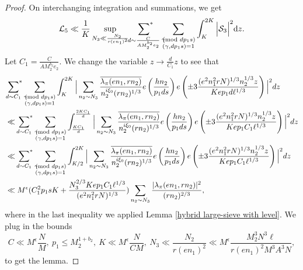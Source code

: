 \documentclass[12pt,a4paper,twoside, reqno]{amsart}
\newcommand{\shortmod}{\ensuremath{\negthickspace \negthickspace \negthickspace \pmod}}
\newcommand{\sumstar}{\sideset{}{^*}\sum}
\begin{document}
\begin{proof}
On interchanging integration and summations, we get 
\begin{align*}
     \mathcal{L}_5 \ll \frac{1}{K} \sup_{N_3 \ll \frac{N_2}{r (en_1)^2}} \mathop{\sumstar_{ \substack{d \sim \frac{C}{A M_2^{b_2} e_2}
       } } }\sum_{\substack{ \gamma \shortmod{dp_1s} \\ (\gamma, dp_1s)=1 }   }  \int_K^{2K}  \Big| \mathcal{S}_3  \Big|^2 \mathrm{d}z.
\end{align*}
Let $C_1=\frac{C}{AM_2^{b_2}e_2} $. We change the variable $z \rightarrow  \frac{d}{C_1}z$ to see that 
\begin{align*}
     &\mathop{\sumstar_{ \substack{d \sim {C_1}{ }
       } } }\sum_{\substack{ \gamma \shortmod{dp_1s} \\ (\gamma, dp_1s)=1 }   }  \int_K^{2K}  \Big|  \sum_{n_2 \sim N_3} \frac{\overline{\lambda_\pi(en_1,rn_2)}}{n_2^{i \xi_0}  {(rn_2)^{1/3}}  }  e\left( \frac{hn_2}{p_1ds}\right) e\left(\pm 3 \frac{(e^2n_1^2r N)^{1/3}n_2^{1/3}z^{} }{ K ep_1d \ell^{{1/3}}}\right)  \Big|^2 dz \\
       & \ll   \mathop{\sumstar_{ \substack{d \sim  {C_1}{ }
       } } }\sum_{\substack{ \gamma \shortmod{dp_1s} \\ (\gamma, dp_1s)=1 }   }  \int_{\frac{KC_1}{d} }^{ \frac{2KC_1}{d}}  \Big|  \sum_{n_2 \sim N_3} \frac{\overline{\lambda_\pi(en_1,rn_2)}}{n_2^{i \xi_0}  {(rn_2)^{1/3}}  }  e\left( \frac{hn_2}{p_1ds}\right) e\left(\pm 3 \frac{(e^2n_1^2r N)^{1/3}n_2^{1/3}z^{} }{ K ep_1C_1 \ell^{{1/3}}}\right)  \Big|^2 dz  \\
        & \ll   \mathop{\sumstar_{ \substack{d \sim  {C_1}{ }
       } } }\sum_{\substack{ \gamma \shortmod{dp_1s} \\ (\gamma, dp_1s)=1 }   }  \int_{{K/2}{} }^{ {2K}{}}  \Big|  \sum_{n_2 \sim N_3} \frac{\overline{\lambda_\pi(en_1,rn_2)}}{n_2^{i \xi_0}  {(rn_2)^{1/3}}  }  e\left( \frac{hn_2}{p_1ds}\right) e\left(\pm 3 \frac{(e^2n_1^2r N)^{1/3}n_2^{1/3}z^{} }{ K ep_1C_1 \ell^{{1/3}}}\right)  \Big|^2 dz  \\
       &\ll M^\epsilon ( C_1^2p_1sK+ \frac{ N_3^{2/3} K ep_1C_1 \ell^{1/3} } {(e^2n_1^2rN)^{1/3}}) \sum_{n_2 \sim N_3} \frac{ {|\lambda_\pi(en_1,rn_2)|^2}}{  {(rn_2)^{2/3}}  },
\end{align*}
where in the last inequality we applied Lemma \ref{hybrid large-sieve with level}. We plug in  the bounds $$C \ll M^{\epsilon}\frac{N}{M}, \ p_1 \leq M_2^{1+b_2}, \ K \ll M^\epsilon \frac{N}{CM},\  N_3 \ll \frac{ N_2}{r(en_1)^2} \ll M^\epsilon\frac{ M_2^3 N^3\ell  }{r(en_1)^2 M^3  A^3N},$$ to get the lemma. 

\end{proof}
\end{document}
